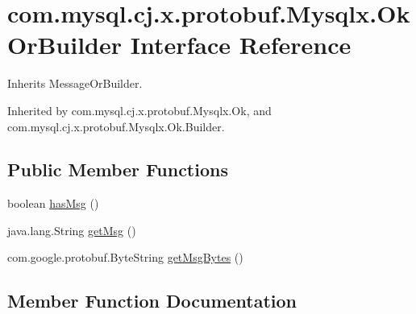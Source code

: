 \hypertarget{interfacecom_1_1mysql_1_1cj_1_1x_1_1protobuf_1_1_mysqlx_1_1_ok_or_builder}{}\section{com.\+mysql.\+cj.\+x.\+protobuf.\+Mysqlx.\+Ok\+Or\+Builder Interface Reference}
\label{interfacecom_1_1mysql_1_1cj_1_1x_1_1protobuf_1_1_mysqlx_1_1_ok_or_builder}


Inherits Message\+Or\+Builder.



Inherited by com.\+mysql.\+cj.\+x.\+protobuf.\+Mysqlx.\+Ok, and com.\+mysql.\+cj.\+x.\+protobuf.\+Mysqlx.\+Ok.\+Builder.

\subsection*{Public Member Functions}
\begin{DoxyCompactItemize}
\item 
boolean \mbox{\hyperlink{interfacecom_1_1mysql_1_1cj_1_1x_1_1protobuf_1_1_mysqlx_1_1_ok_or_builder_a9b1ae02c52fbfc44576de1addcfe0bf4}{has\+Msg}} ()
\item 
java.\+lang.\+String \mbox{\hyperlink{interfacecom_1_1mysql_1_1cj_1_1x_1_1protobuf_1_1_mysqlx_1_1_ok_or_builder_ae68d5e88481475e5ad402cd5e57b0743}{get\+Msg}} ()
\item 
com.\+google.\+protobuf.\+Byte\+String \mbox{\hyperlink{interfacecom_1_1mysql_1_1cj_1_1x_1_1protobuf_1_1_mysqlx_1_1_ok_or_builder_af92cf058531f0821e02b879fcebb390d}{get\+Msg\+Bytes}} ()
\end{DoxyCompactItemize}


\subsection{Member Function Documentation}
\mbox{\label{interfacecom_1_1mysql_1_1cj_1_1x_1_1protobuf_1_1_mysqlx_1_1_ok_or_builder_ae68d5e88481475e5ad402cd5e57b0743}} 
